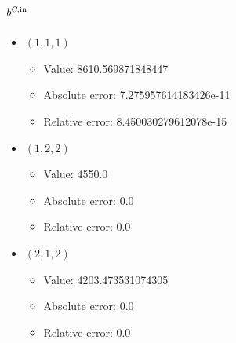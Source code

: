 \documentclass{article}%
\begin{document}
\subsection{$b^{\textsl{C},\text{in}}$}%
\begin{itemize}%
	\item $(1, 1, 1)$%
	\begin{itemize}%
		\item Value: 8610.569871848447%
		\item Absolute error: 7.275957614183426e-11%
		\item Relative error: 8.450030279612078e-15%
	\end{itemize}%
	\item $(1, 2, 2)$%
	\begin{itemize}%
		\item Value: 4550.0%
		\item Absolute error: 0.0%
		\item Relative error: 0.0%
	\end{itemize}%
	\item $(2, 1, 2)$%
	\begin{itemize}%
		\item Value: 4203.473531074305%
		\item Absolute error: 0.0%
		\item Relative error: 0.0%
	\end{itemize}%
\end{itemize}%
\end{document}
